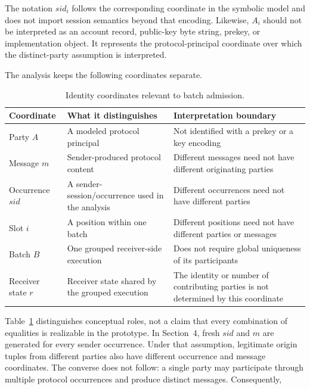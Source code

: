 The notation $\mathit{sid}_i$ follows the corresponding coordinate in the
symbolic model and does not import session semantics beyond that encoding.
Likewise, $A_i$ should not be interpreted as an account record, public-key byte
string, prekey, or implementation object. It represents the protocol-principal
coordinate over which the distinct-party assumption is interpreted.

The analysis keeps the following coordinates separate.

\begin{table}[htbp]
  \centering
  \caption{Identity coordinates relevant to batch admission.}
  \label{tab:identity-coordinates}
  \small
  \begin{tabularx}{\linewidth}{@{}lXX@{}}
    \toprule
    Coordinate & What it distinguishes & Interpretation boundary \\
    \midrule
    Party $A$ & A modeled protocol principal & Not identified with a prekey
      or a key encoding \\
    Message $m$ & Sender-produced protocol content & Different messages need not
      have different originating parties \\
    Occurrence $\mathit{sid}$ & A sender-session/occurrence used in the analysis
      & Different occurrences need not have different parties \\
    Slot $i$ & A position within one batch & Different positions need not have
      different parties or messages \\
    Batch $B$ & One grouped receiver-side execution & Does not require global
      uniqueness of its participants \\
    Receiver state $r$ & Receiver state shared by the grouped execution & The
      identity or number of contributing parties is not determined by this coordinate \\
    \bottomrule
  \end{tabularx}
\end{table}

Table~\ref{tab:identity-coordinates} distinguishes conceptual roles, not a
claim that every combination of equalities is realizable in the prototype.
In Section~4, fresh $\mathit{sid}$ and $m$ are generated for every sender
occurrence. Under that assumption, legitimate origin tuples from different
parties also have different occurrence and message coordinates. The converse
does not follow: a single party may
participate through multiple protocol occurrences and produce distinct
messages. Consequently,

